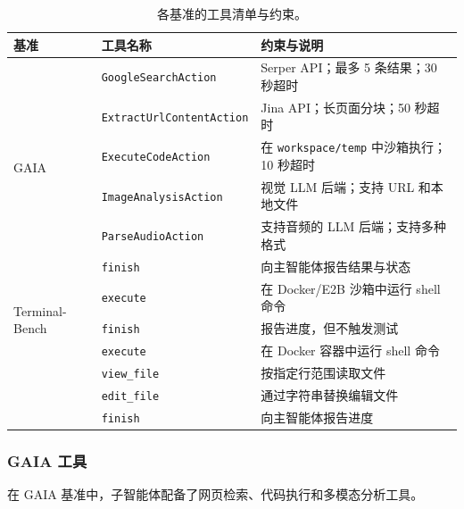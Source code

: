 \begin{table}[t]
\centering
\small
\caption{各基准的工具清单与约束。}
\label{tab:D_tools}
\begin{tabular}{l l p{5.8cm}}
\toprule
\textbf{基准} & \textbf{工具名称} & \textbf{约束与说明} \\
\midrule
\multirow{6}{*}{GAIA}
  & \texttt{GoogleSearchAction} & Serper API；最多 5 条结果；30 秒超时 \\
  & \texttt{ExtractUrlContentAction} & Jina API；长页面分块；50 秒超时 \\
  & \texttt{ExecuteCodeAction} & 在 \texttt{workspace/temp} 中沙箱执行；10 秒超时 \\
  & \texttt{ImageAnalysisAction} & 视觉 LLM 后端；支持 URL 和本地文件 \\
  & \texttt{ParseAudioAction} & 支持音频的 LLM 后端；支持多种格式 \\
  & \texttt{finish} & 向主智能体报告结果与状态 \\
\midrule
\multirow{3}{*}{Terminal-Bench}
  & \texttt{execute} & 在 Docker/E2B 沙箱中运行 shell 命令 \\
  & \texttt{finish} & 报告进度，但不触发测试 \\

\midrule
\multirow{4}{*}{SWE-Bench}
  & \texttt{execute} & 在 Docker 容器中运行 shell 命令 \\
  & \texttt{view\_file} & 按指定行范围读取文件 \\
  & \texttt{edit\_file} & 通过字符串替换编辑文件 \\
  & \texttt{finish} & 向主智能体报告进度 \\
\bottomrule
\end{tabular}
\end{table}

\subsubsection{GAIA 工具}

在 GAIA 基准中，子智能体配备了网页检索、代码执行和多模态分析工具。

